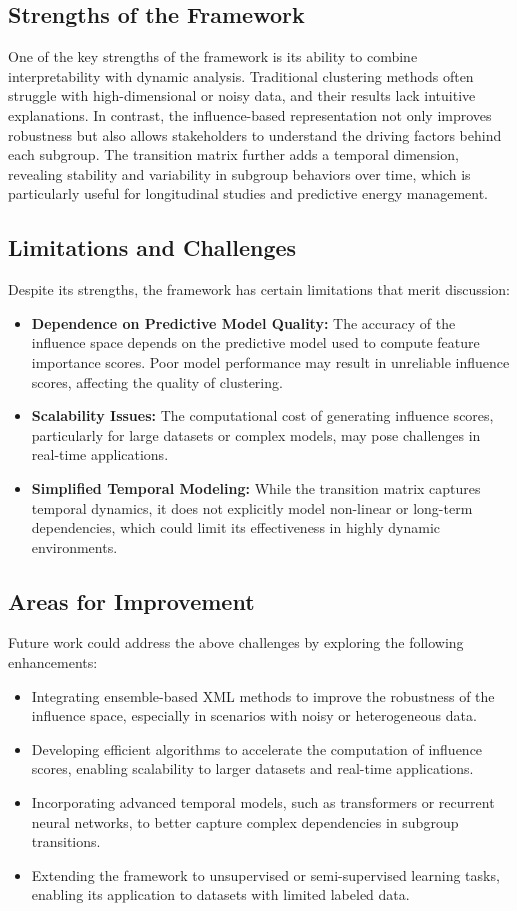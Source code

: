 \documentclass[final,5p,times,twocolumn,numbers]{elsarticle}
\begin{document}
\subsection{Strengths of the Framework}
One of the key strengths of the framework is its ability to combine interpretability with dynamic analysis. Traditional clustering methods often struggle with high-dimensional or noisy data, and their results lack intuitive explanations. In contrast, the influence-based representation not only improves robustness but also allows stakeholders to understand the driving factors behind each subgroup. The transition matrix further adds a temporal dimension, revealing stability and variability in subgroup behaviors over time, which is particularly useful for longitudinal studies and predictive energy management.

\subsection{Limitations and Challenges}
Despite its strengths, the framework has certain limitations that merit discussion:
\begin{itemize}
    \item \textbf{Dependence on Predictive Model Quality:} The accuracy of the influence space depends on the predictive model used to compute feature importance scores. Poor model performance may result in unreliable influence scores, affecting the quality of clustering.
    \item \textbf{Scalability Issues:} The computational cost of generating influence scores, particularly for large datasets or complex models, may pose challenges in real-time applications.
    \item \textbf{Simplified Temporal Modeling:} While the transition matrix captures temporal dynamics, it does not explicitly model non-linear or long-term dependencies, which could limit its effectiveness in highly dynamic environments.
\end{itemize}

\subsection{Areas for Improvement}
Future work could address the above challenges by exploring the following enhancements:
\begin{itemize}
    \item Integrating ensemble-based XML methods to improve the robustness of the influence space, especially in scenarios with noisy or heterogeneous data.
    \item Developing efficient algorithms to accelerate the computation of influence scores, enabling scalability to larger datasets and real-time applications.
    \item Incorporating advanced temporal models, such as transformers or recurrent neural networks, to better capture complex dependencies in subgroup transitions.
    \item Extending the framework to unsupervised or semi-supervised learning tasks, enabling its application to datasets with limited labeled data.
\end{itemize}
\end{document}
